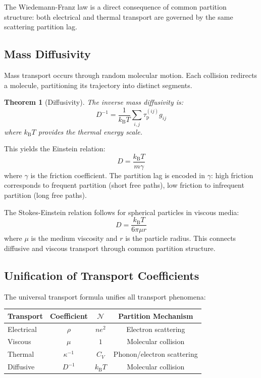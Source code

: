 \documentclass[twocolumn,10pt,aps,prd,superscriptaddress,nofootinbib]{revtex4-2}
\newtheorem{theorem}{Theorem}[section]
\theoremstyle{remark}
\newcommand{\kB}{k_{\mathrm{B}}}
\newcommand{\tauP}{\tau_{\mathrm{p}}}
\newcommand{\Gij}{g_{ij}}
\newcommand{\Norm}{\mathcal{N}}
\begin{document}
The Wiedemann-Franz law is a direct consequence of common partition structure: both electrical and thermal transport are governed by the same scattering partition lag.

\subsection{Mass Diffusivity}

Mass transport occurs through random molecular motion. Each collision redirects a molecule, partitioning its trajectory into distinct segments.

\begin{theorem}[Diffusivity]
\label{thm:diffusivity}
The inverse mass diffusivity is:
\begin{equation}
D^{-1} = \frac{1}{\kB T} \sum_{i,j} \tauP^{(ij)} \Gij
\label{eq:diffusivity}
\end{equation}
where $\kB T$ provides the thermal energy scale.
\end{theorem}

This yields the Einstein relation:
\begin{equation}
D = \frac{\kB T}{m \gamma}
\label{eq:einstein_relation}
\end{equation}
where $\gamma$ is the friction coefficient. The partition lag is encoded in $\gamma$: high friction corresponds to frequent partition (short free paths), low friction to infrequent partition (long free paths).

The Stokes-Einstein relation follows for spherical particles in viscous media:
\begin{equation}
D = \frac{\kB T}{6\pi\mu r}
\label{eq:stokes_einstein}
\end{equation}
where $\mu$ is the medium viscosity and $r$ is the particle radius. This connects diffusive and viscous transport through common partition structure.

\subsection{Unification of Transport Coefficients}

The universal transport formula unifies all transport phenomena:

\begin{center}
\begin{tabular}{lccc}
\toprule
Transport & Coefficient & $\Norm$ & Partition Mechanism \\
\midrule
Electrical & $\rho$ & $ne^2$ & Electron scattering \\
Viscous & $\mu$ & $1$ & Molecular collision \\
Thermal & $\kappa^{-1}$ & $C_V$ & Phonon/electron scattering \\
Diffusive & $D^{-1}$ & $\kB T$ & Molecular collision \\
\bottomrule
\end{tabular}
\end{center}
\end{document}
